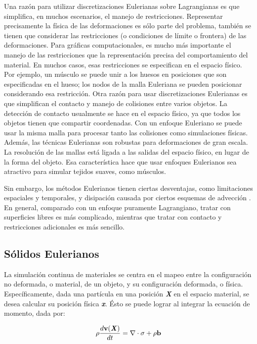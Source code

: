 Una razón para utilizar discretizaciones Eulerianas sobre Lagrangianas es que simplifica, en muchos escenarios, el manejo de restricciones. Representar precisamente la física de las deformaciones es sólo parte del problema, también se tienen que considerar las restricciones (o condiciones de límite o frontera) de las deformaciones. Para gráficas computacionales, es mucho más importante el manejo de las restricciones que la representación precisa del comportamiento del material. En muchos casos, esas restricciones se especifican en el espacio físico. Por ejemplo, un músculo se puede unir a los huesos en posiciones que son especificadas en el hueso; los nodos de la malla Euleriana se pueden posicionar considerando esa restricción. Otra razón para usar discretizaciones Eulerianas es que simplifican el contacto y manejo de colisiones entre varios objetos. La detección de contacto usualmente se hace en el espacio físico, ya que todos los objetos tienen que compartir coordenadas. Con un enfoque Euleriano se puede usar la misma malla para procesar tanto las colisiones como simulaciones físicas. Además, las técnicas Eulerianas son robustas para deformaciones de gran escala. La resolución de las mallas está ligada a las salidas del espacio físico, en lugar de la forma del objeto. Esa característica hace que usar enfoques Eulerianos sea atractivo para simular tejidos suaves, como músculos. 

Sin embargo, los métodos Eulerianos tienen ciertas desventajas, como limitaciones espaciales y temporales, y disipación causada por ciertos esquemas de advección \citep{fan2013eulerian}. En general, comparado con un enfoque puramente Lagrangiano, tratar con superficies libres es más complicado, mientras que tratar con contacto y restricciones adicionales es más sencillo.

\subsection{Sólidos Eulerianos}

La simulación continua de materiales se centra en el mapeo entre la configuración no deformada, o material, de un objeto, y su configuración deformada, o física. Específicamente, dada una partícula en una posición \textbf{\textit{X}} en el espacio material, se desea calcular su posición física \textbf{\textit{x}}. Ésto se puede lograr al integrar la ecuación de momento, dada por:

\begin{equation}
	\rho \frac{d \textbf{v} (\textbf{\textit{X}})}{dt} = \nabla \cdot \sigma + \rho \textbf{b}
	\label{eq:momentum}
\end{equation}

